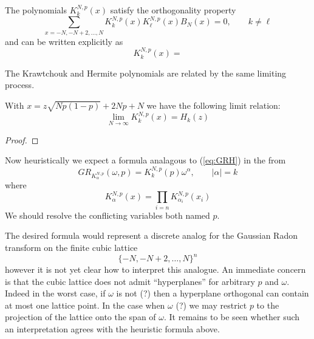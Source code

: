 The polynomials $K^{N,p}_k(x)$ satisfy the orthogonality property
\[
  \sum_{x = -N, -N+2, \ldots, N} K^{N,p}_k(x) K^{N,p}_\ell(x) B_N(x) = 0, \qquad k \neq \ell
\]
and can be written explicitly as
\[
  K^{N,p}_k(x) = 
\]

The Krawtchouk and Hermite polynomials are related by the same limiting process.
\begin{proposition}
  With $x = z \sqrt{Np(1-p)} + 2Np + N$ we have the following limit relation:
  \[
    \lim_{N \rightarrow \infty} K^{N,p}_k(x) = H_k(z)
  \]
\end{proposition}

\begin{proof}
  \pn
\end{proof}

Now heuristically we expect a formula analagous to (\ref{eq:GRH}) in the from
\[
  GR_{K^{N,p}_\alpha}(\omega, p) = K^{N,p}_k(p)\omega^\alpha, \qquad |\alpha| = k
\]
where 
\[
  K^{N,p}_\alpha(x) = \prod_{i = n} K^{N,p}_{\alpha_i}(x_i)
\]
We should resolve the conflicting variables both named $p$.

The desired formula would represent a discrete analog for the Gaussian Radon transform on the finite cubic lattice
\[
  \{-N, -N+2, \ldots, N\}^n
\]
however it is not yet clear how to interpret this analogue. An immediate concern is that the cubic lattice does not admit ``hyperplanes'' for arbitrary $p$ and $\omega$. Indeed in the worst case, if $\omega$ is not (?) then a hyperplane orthogonal can contain at most one lattice point. In the case when $\omega$ (?) we may restrict $p$ to the projection of the lattice onto the span of $\omega$. It remains to be seen whether such an interpretation agrees with the heuristic formula above.



